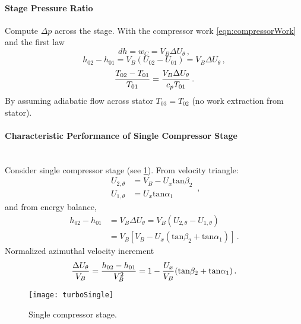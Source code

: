 \paragraph*{Stage Pressure Ratio} Compute $\Delta p$ across the stage. With the compressor work \cref{eqn:compressorWork} and the first law
\[
  dh = w_C = V_B \Delta U_\theta\,,
\]
\[
  h_{02}-h_{01} = V_B (U_{02} - U_{01})  = V_B \Delta U_\theta\,,
\]
\[
{\frac{T_{02}-T_{01}}{T_{01}}} = {\frac{V_B \Delta U_\theta}{c_p T_{01}}}\,.
\]
By assuming adiabatic flow across stator $T_{03} = T_{02}$ (no work extraction from stator).

\paragraph{Characteristic Performance of Single Compressor Stage} \mbox{} \\[0.5em]
Consider single compressor stage (see \cref{FIG_TURBO_SINGLE}). From velocity triangle:
\begin{equation}
  \begin{split}
  U_{2, \theta} &= V_B - U_x \text{tan} \beta_2\\
  U_{1, \theta} &= U_x \text{tan} \alpha_1
  \end{split} \,,
\end{equation}
and from energy balance,
\begin{equation}
  \begin{split}
  h_{02} - h_{01} &= V_B \Delta U_\theta = V_B (U_{2, \theta} - U_{1, \theta})\\
                           &= V_B [V_B - U_x (\text{tan} \beta_2 + \text{tan} \alpha_1 )]\,.
  \end{split}
\end{equation}
Normalized azimuthal velocity increment
\begin{equation}
  {\frac{\Delta U_\theta}{V_B}} = {\frac{h_{02} - h_{01}}{V_B^2}} = 1 - {\frac{U_x}{V_B}} (\text{tan} \beta_2 + \text{tan} \alpha_1)\,.
\end{equation}

\begin{figure}[!htb!]
 \centering
    {\texttt{[image: turboSingle]}}
    \caption{\label{FIG_TURBO_SINGLE}Single compressor stage.}
\end{figure}

